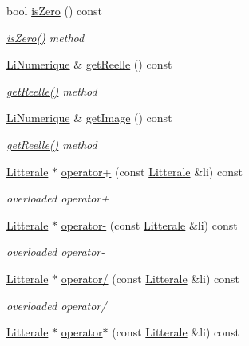\begin{DoxyCompactItemize}
bool \hyperlink{class_li_complexe_a6bcabbf5bcf296fdb048c9be278f175a}{is\+Zero} () const 
\begin{DoxyCompactList}\small\item\em \hyperlink{class_li_complexe_a6bcabbf5bcf296fdb048c9be278f175a}{is\+Zero()} method \end{DoxyCompactList}\item 
\hyperlink{class_li_numerique}{Li\+Numerique} \& \hyperlink{class_li_complexe_abd5cae3001a94af1c18f7bb5092c9527}{get\+Reelle} () const 
\begin{DoxyCompactList}\small\item\em \hyperlink{class_li_complexe_abd5cae3001a94af1c18f7bb5092c9527}{get\+Reelle()} method \end{DoxyCompactList}\item 
\hyperlink{class_li_numerique}{Li\+Numerique} \& \hyperlink{class_li_complexe_ab0984cadf03a19e440dce8cea70b86e0}{get\+Image} () const 
\begin{DoxyCompactList}\small\item\em \hyperlink{class_li_complexe_abd5cae3001a94af1c18f7bb5092c9527}{get\+Reelle()} method \end{DoxyCompactList}\item 
\hyperlink{class_litterale}{Litterale} $\ast$ \hyperlink{class_li_complexe_a10fc45528f4f674e5afdddcd49cfefe8}{operator+} (const \hyperlink{class_litterale}{Litterale} \&li) const 
\begin{DoxyCompactList}\small\item\em overloaded operator+ \end{DoxyCompactList}\item 
\hyperlink{class_litterale}{Litterale} $\ast$ \hyperlink{class_li_complexe_aafe560e78d42938bce8e42672850f187}{operator-\/} (const \hyperlink{class_litterale}{Litterale} \&li) const 
\begin{DoxyCompactList}\small\item\em overloaded operator-\/ \end{DoxyCompactList}\item 
\hyperlink{class_litterale}{Litterale} $\ast$ \hyperlink{class_li_complexe_ab9dbace3f0fbd634a6258c4bcb5dc659}{operator/} (const \hyperlink{class_litterale}{Litterale} \&li) const 
\begin{DoxyCompactList}\small\item\em overloaded operator/ \end{DoxyCompactList}\item 
\hyperlink{class_litterale}{Litterale} $\ast$ \hyperlink{class_li_complexe_a88ad289cf55d8e6d89f0d77cf09d2ccf}{operator$\ast$} (const \hyperlink{class_litterale}{Litterale} \&li) const 

\end{DoxyCompactItemize}
